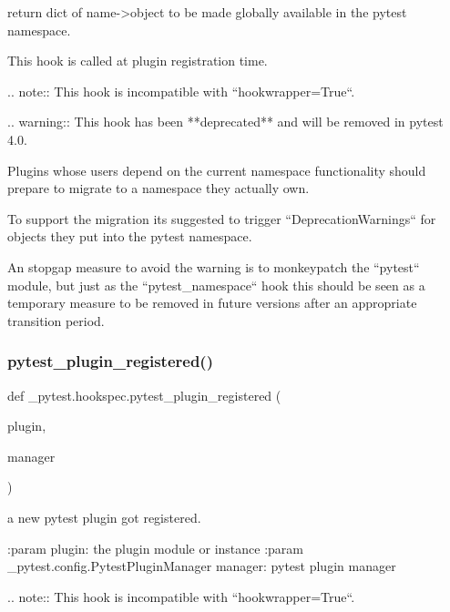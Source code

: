 \begin{DoxyVerb}return dict of name->object to be made globally available in
the pytest namespace.

This hook is called at plugin registration time.

.. note::
    This hook is incompatible with ``hookwrapper=True``.

.. warning::
    This hook has been **deprecated** and will be removed in pytest 4.0.

    Plugins whose users depend on the current namespace functionality should prepare to migrate to a
    namespace they actually own.

    To support the migration its suggested to trigger ``DeprecationWarnings`` for objects they put into the
    pytest namespace.

    An stopgap measure to avoid the warning is to monkeypatch the ``pytest`` module, but just as the
    ``pytest_namespace`` hook this should be seen as a temporary measure to be removed in future versions after
    an appropriate transition period.
\end{DoxyVerb}
 \mbox{\label{namespace__pytest_1_1hookspec_a1f7205d1f8769d02e7d3c6e86f596a45}} 
\subsubsection{\texorpdfstring{pytest\+\_\+plugin\+\_\+registered()}{pytest\_plugin\_registered()}}
{\footnotesize\ttfamily def \+\_\+pytest.\+hookspec.\+pytest\+\_\+plugin\+\_\+registered (\begin{DoxyParamCaption}\item[{}]{plugin,  }\item[{}]{manager }\end{DoxyParamCaption})}

\begin{DoxyVerb}a new pytest plugin got registered.

:param plugin: the plugin module or instance
:param _pytest.config.PytestPluginManager manager: pytest plugin manager

.. note::
    This hook is incompatible with ``hookwrapper=True``.
\end{DoxyVerb}
 \mbox{\label{namespace__pytest_1_1hookspec_aa31c1e08b97093e5520b409d1b496065}} 
